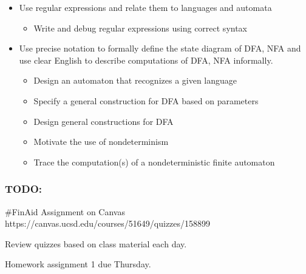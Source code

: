\documentclass[12pt, oneside]{article}
\begin{document}
\begin{itemize}
\item Use regular expressions and relate them to languages and automata
\begin{itemize}

   \item Write and debug regular expressions using correct syntax

\end{itemize}

\item Use precise notation to formally define the state diagram of DFA, NFA and 
use clear English to describe computations of DFA, NFA informally.

\begin{itemize}
   \item Design an automaton that recognizes a given language

   \item Specify a general construction for DFA based on parameters

   \item Design general constructions for DFA

   \item Motivate the use of nondeterminism

   \item Trace the computation(s) of a nondeterministic finite automaton

\end{itemize}






\end{itemize}

\subsubsection*{TODO:}
\begin{list}
   {\itemsep2pt}
   \item \#FinAid Assignment on Canvas https://canvas.ucsd.edu/courses/51649/quizzes/158899
   \item Review quizzes based on class material each day. 
   \item Homework assignment 1 due Thursday.
\end{list}
\end{document}
